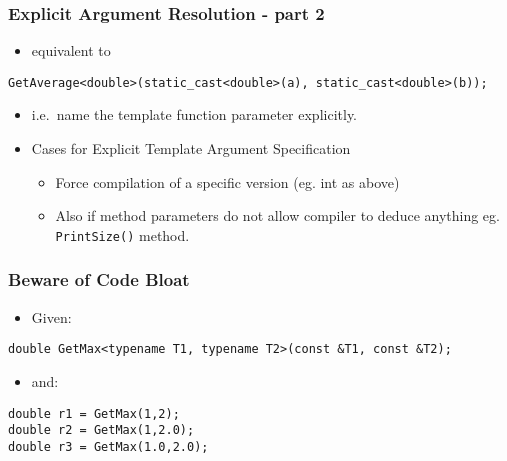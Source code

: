 \subsubsection{Explicit Argument Resolution - part
2}\label{explicit-argument-resolution---part-2}

\begin{itemize}
\itemsep1pt\parskip0pt
\item
  equivalent to
\end{itemize}

\texttt{GetAverage\textless{}double\textgreater{}(static\_cast\textless{}double\textgreater{}(a), static\_cast\textless{}double\textgreater{}(b));}

\begin{itemize}
\item
  i.e.~name the template function parameter explicitly.
\item
  Cases for Explicit Template Argument Specification

  \begin{itemize}
  \itemsep1pt\parskip0pt
  \item
    Force compilation of a specific version (eg. int as above)
  \item
    Also if method parameters do not allow compiler to deduce anything
    eg. \texttt{PrintSize()} method.
  \end{itemize}
\end{itemize}

\subsubsection{Beware of Code Bloat}\label{beware-of-code-bloat}

\begin{itemize}
\itemsep1pt\parskip0pt
\item
  Given:
\end{itemize}

\begin{verbatim}
double GetMax<typename T1, typename T2>(const &T1, const &T2);
\end{verbatim}

\begin{itemize}
\itemsep1pt\parskip0pt
\item
  and:
\end{itemize}

\begin{verbatim}
double r1 = GetMax(1,2);
double r2 = GetMax(1,2.0);
double r3 = GetMax(1.0,2.0);
\end{verbatim}

